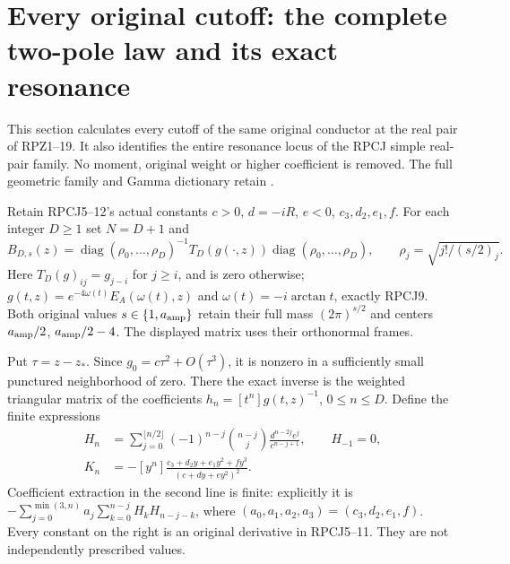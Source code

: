 \section{Every original cutoff: the complete two-pole law and its exact resonance}
This section calculates every cutoff of the same original conductor
at the real pair of RPZ1--19. It also identifies the entire resonance
locus of the RPCJ simple real-pair family. No moment, original weight
or higher coefficient is removed. The full geometric family and
Gamma dictionary retain \cite{PCLOriginal,WCF,DLMF18Source}.

Retain RPCJ5--12's actual constants $c>0$, $d=-iR$, $e<0$,
$c_3,d_2,e_1,f$. For each integer $D\ge1$ set $N=D+1$ and
\[
 B_{D,s}(z)=\operatorname{diag}(\rho_0,\ldots,\rho_D)^{-1}
          T_D(g(\cdot,z))\operatorname{diag}(\rho_0,\ldots,\rho_D),
 \qquad \rho_j=\sqrt{j!/(s/2)_j}.
 \tag{RPAC1}
\]
Here $T_D(g)_{ij}=g_{j-i}$ for $j\ge i$, and is zero otherwise;
$g(t,z)=e^{-4\omega(t)}E_A(\omega(t),z)$ and
$\omega(t)=-i\arctan t$, exactly RPCJ9. Both original values
$s\in\{1,a_{\rm amp}\}$ retain their full mass
$(2\pi)^{s/2}$ and centers $a_{\rm amp}/2$, $a_{\rm amp}/2-4$.
The displayed matrix uses their orthonormal frames.

Put $\tau=z-z_*$. Since $g_0=c\tau^2+O(\tau^3)$, it is
nonzero in a sufficiently small punctured neighborhood of zero.
There the exact inverse is the weighted triangular matrix of the
coefficients $h_n=[t^n]g(t,z)^{-1}$, $0\le n\le D$.
Define the finite expressions
\[
 \begin{aligned}
 H_n&=\sum_{j=0}^{\lfloor n/2\rfloor}
    (-1)^{n-j}\binom{n-j}{j}
           \frac{d^{n-2j}e^j}{c^{n-j+1}},\qquad H_{-1}=0,\\
 K_n&=-[y^n]\frac{c_3+d_2y+e_1y^2+fy^3}{(c+dy+ey^2)^2}.
 \end{aligned}\tag{RPAC2}
\]
Coefficient extraction in the second line is finite: explicitly it is
$-\sum_{j=0}^{\min(3,n)}a_j\sum_{k=0}^{n-j}H_kH_{n-j-k}$,
where $(a_0,a_1,a_2,a_3)=(c_3,d_2,e_1,f)$.
Every constant on the right is an original derivative in RPCJ5--11.
They are not independently prescribed values.

